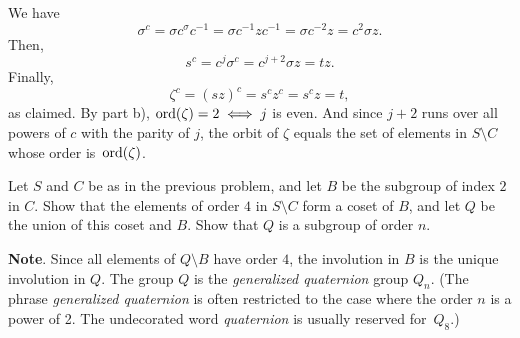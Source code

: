 \begin{solution}
\begin{enumerate}[\rm a)]
    We have
    $$
        \sigma^c = \sigma c^\sigma c^{-1}
            = \sigma c^{-1}zc^{-1}
            = \sigma c^{-2}z = c^2\sigma z.
    $$
    Then,
    $$
        s^c = c^j\sigma^c
            = c^{j+2}\sigma z
            = tz.
    $$
    Finally,
    $$
        \zeta^c=(sz)^c=s^c z^c=s^cz=t,
    $$
    as claimed. By part b), ${\rm ord}(\zeta)=2\iff j$ is even. And since $j+2$ runs over all powers of $c$ with the parity of $j$, the orbit of $\zeta$ equals the set of elements in $S\setminus C$ whose order is~${\rm ord}(\zeta)$.
\end{enumerate}
\end{solution}

\begin{probl}
    Let\/ $S$ and\/ $C$ be as in the previous problem, and let\/ $B$ be the subgroup of index\/ $2$ in\/ $C$. Show that the elements of order\/ $4$ in\/ $S\setminus C$ form a coset of\/ $B$, and let\/ $Q$ be the union of this coset and\/ $B$. Show that\/ $Q$ is a subgroup of order\/ $n$.
    
    \textrm{\rm\textbf{Note}. Since all elements of\/ $Q\setminus B$ have order $4$, the involution in\/ $B$ is the unique involution in\/ $Q$. The group\/ $Q$ is the \textsl{generalized quaternion} group\/ $Q_n$. (The phrase \textit{generalized quaternion\/} is often restricted to the case where the order\/ $n$ is a power of 2. The undecorated word \textit{quaternion\/} is usually reserved for\/~$Q_8$.)}
\end{probl}

